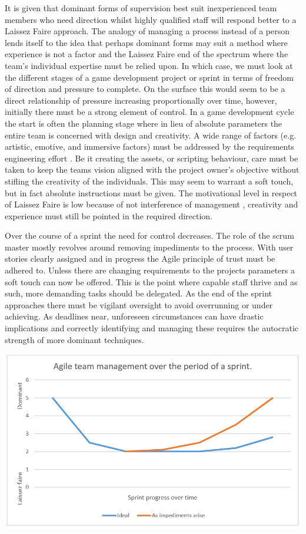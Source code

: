 \documentclass{scrartcl}
\begin{document}
It is given that dominant forms of supervision best suit inexperienced team members who need direction whilst highly qualified staff will respond better to a Laissez Faire approach.  The analogy of managing a process instead of a person lends itself to the idea that perhaps dominant forms may suit a method where experience is not a factor and the Laissez Faire end of the spectrum where the team's individual expertise must be relied upon.  In which case, we must look at the different stages of a game development project or sprint in terms of freedom of direction and pressure to complete.  On the surface this would seem to be a direct relationship of pressure increasing proportionally over time, however, initially there must be a strong element of control.  In a game development cycle the start is often the planning stage where in lieu of absolute parameters the entire team is concerned with design and creativity.  A wide range of factors (e.g. artistic, emotive, and immersive factors) must be addressed by the requirements engineering effort \cite{callele2005requirements}.  Be it creating the assets, or scripting behaviour, care must be taken to keep the teams vision aligned with the project owner's objective without stifling the creativity of the individuals.  This may seem to warrant a soft touch, but in fact absolute instructions must be given.  The motivational level in respect of Laissez Faire is low because of not interference of management \cite{chaudhry2012impact}, creativity and experience must still be pointed in the required direction.

Over the course of a sprint the need for control decreases.  The role of the scrum master mostly revolves around removing impediments to the process.  With user stories clearly assigned and in progress the Agile principle of trust must be adhered to.  Unless there are changing requirements to the projects parameters a soft touch can now be offered.  This is the point where capable staff thrive and as such, more demanding tasks should be delegated.  As the end of the sprint approaches there must be vigilant oversight to avoid overrunning or under achieving.  As deadlines near, unforeseen circumstances can have drastic implications and correctly identifying and managing these requires the autocratic strength of more dominant techniques. 

\includegraphics{agile_graph.png}
\end{document}

